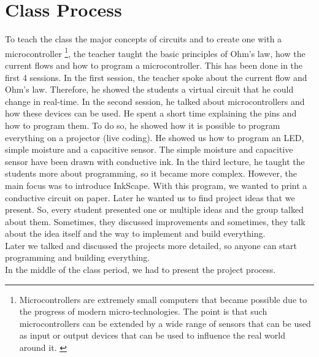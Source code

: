 \documentclass[00_doc.tex]{subfiles}
\begin{document}
    \section{Class Process}
    \begin{flushleft}
        To teach the class the major concepts of circuits and to create one with a microcontroller {\footnote{\label{foot:
        microcontroller} Microcontrollers are extremely small computers that became possible due to the progress of modern 
        micro-technologies. The point is that such microcontrollers can be extended by a wide range of sensors that can 
        be used as input or output devices that can be used to influence the real world around it. \cite{Schief1997, 
        Dembowski2014}}}, the teacher taught the basic principles of Ohm's law, how the current flows and how to program 
        a microcontroller. This has been done in the first 4 sessions.\newline
        In the first session, the teacher spoke about the current flow and Ohm's law. Therefore, he showed the students
        a virtual circuit that he could change in real-time.\newline
        In the second session, he talked about microcontrollers and how these devices can be used. He spent a short
        time explaining the pins and how to program them. To do so, he showed how it is possible to program
        everything on a projector (live coding). He showed us how to program an LED, simple moisture and 
        a capacitive sensor. The simple moisture and capacitive sensor have been drawn with conductive ink.\newline
        In the third lecture, he taught the students more about programming, so it became more complex. However, 
        the main focus was to introduce InkScape. With this program, we wanted to print a conductive circuit on paper.\newline
        Later he wanted us to find project ideas that we present. So, every student presented one or multiple ideas and
        the group talked about them. Sometimes, they discussed improvements and sometimes, they talk about the idea itself
        and the way to implement and build everything. \\
        Later we talked and discussed the projects more detailed, so anyone can start programming and building everything.\\
        In the middle of the class period, we had to present the project process.  
    \end{flushleft}
\end{document}
